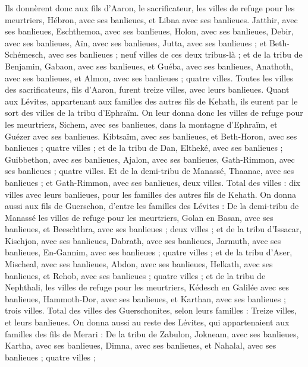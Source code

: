 \begin{multicols}{2}
Ils donnèrent donc aux fils d’Aaron, le sacrificateur, les villes de refuge pour les meurtriers, Hébron, avec ses banlieues, et Libna avec ses banlieues.
Jatthir, avec ses banlieues, Eschthemoa, avec ses banlieues,
Holon, avec ses banlieues, Debir, avec ses banlieues,
Aïn, avec ses banlieues, Jutta, avec ses banlieues ; et Beth-Schémesch, avec ses banlieues ; neuf villes de ces deux tribus-là ;
et de la tribu de Benjamin, Gabaon, avec ses banlieues, et Guéba, avec ses banlieues,
Anathoth, avec ses banlieues, et Almon, avec ses banlieues ; quatre villes.
Toutes les villes des sacrificateurs, fils d’Aaron, furent treize villes, avec leurs banlieues.
Quant aux Lévites, appartenant aux familles des autres fils de Kehath, ils eurent par le sort des villes de la tribu d’Ephraïm.
On leur donna donc les villes de refuge pour les meurtriers, Sichem, avec ses banlieues, dans la montagne d’Ephraïm, et Guézer avec ses banlieues.
Kibtsaïm, avec ses banlieues, et Beth-Horon, avec ses banlieues ; quatre villes ;
et de la tribu de Dan, Eltheké, avec ses banlieues ; Guibbethon, avec ses banlieues,
Ajalon, avec ses banlieues, Gath-Rimmon, avec ses banlieues ; quatre villes.
Et de la demi-tribu de Manassé, Thaanac, avec ses banlieues ; et Gath-Rimmon, avec ses banlieues, deux villes.
Total des villes : dix villes avec leurs banlieues, pour les familles des autres fils de Kehath.
On donna aussi aux fils de Guerschon, d’entre les familles des Lévites : De la demi-tribu de Manassé les villes de refuge pour les meurtriers, Golan en Basan, avec ses banlieues, et Beeschthra, avec ses banlieues ; deux villes ;
et de la tribu d’Issacar, Kischjon, avec ses banlieues, Dabrath, avec ses banlieues,
Jarmuth, avec ses banlieues, En-Gannim, avec ses banlieues ; quatre villes ;
et de la tribu d’Aser, Mischeal, avec ses banlieues, Abdon, avec ses banlieues,
Helkath, avec ses banlieues, et Rehob, avec ses banlieues ; quatre villes ;
et de la tribu de Nephthali, les villes de refuge pour les meurtriers, Kédesch en Galilée avec ses banlieues, Hammoth-Dor, avec ses banlieues, et Karthan, avec ses banlieues ; trois villes.
Total des villes des Guerschonites, selon leurs familles : Treize villes, et leurs banlieues.
On donna aussi au reste des Lévites, qui appartenaient aux familles des fils de Merari : De la tribu de Zabulon, Jokneam, avec ses banlieues, Kartha, avec ses banlieues,
Dimna, avec ses banlieues, et Nahalal, avec ses banlieues ; quatre villes ;

\end{multicols}
